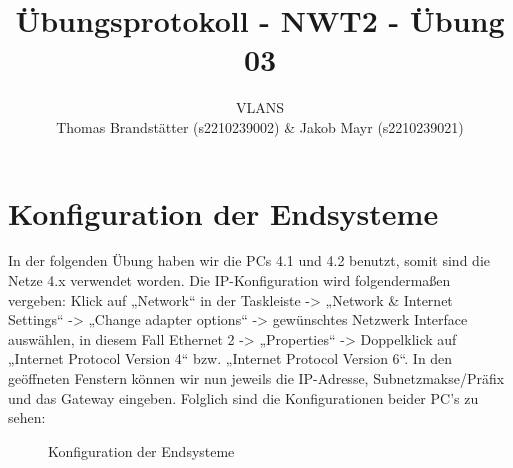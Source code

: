 \documentclass{article.cls}
\title{Übungsprotokoll - NWT2 - Übung 03}
\author{\vspace{0.5cm} \Large VLANS\\ Thomas Brandstätter (s2210239002) & Jakob Mayr (s2210239021)}
\begin{document}
    \maketitle

    \section{Konfiguration der Endsysteme}
    In der folgenden Übung haben wir die PCs 4.1 und 4.2 benutzt, somit sind die Netze 4.x verwendet worden. Die IP-Konfiguration wird folgendermaßen vergeben: Klick auf „Network“ in der Taskleiste -> „Network & Internet Settings“ -> „Change adapter options“ -> gewünschtes Netzwerk Interface auswählen, in diesem Fall Ethernet 2 -> „Properties“ -> Doppelklick auf „Internet Protocol Version 4“ bzw. „Internet Protocol Version 6“. In den geöffneten Fenstern können wir nun jeweils die IP-Adresse, Subnetzmakse/Präfix und das Gateway eingeben. Folglich sind die Konfigurationen beider PC's zu sehen:

    \begin{figure}[ht]
        \centering
        \caption{Konfiguration der Endsysteme}
        \label{fig:four_images}
    \end{figure}
\end{document}
